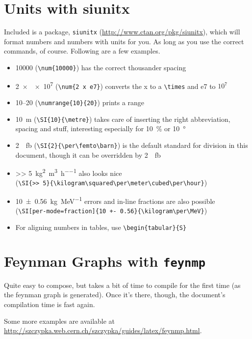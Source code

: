 \section{Units with siunitx} %
\label{sec:units_with_siunitx}
Included is a package, \texttt{siunitx} (\url{http://www.ctan.org/pkg/siunitx}), which will format numbers and numbers with units for you. As long as you use the correct commands, of course. Following are a few examples.
\begin{itemize}
	\item \num{10000} (\verb|\num{10000}|) has the correct thousander spacing
	\item \num{2 x e7} (\verb|\num{2 x e7}|) converts the x to a \verb|\times| and e7 to $10^7$
	\item \numrange{10}{20} (\verb|\numrange{10}{20}|) prints a range
	\item \SI{10}{\metre} (\verb|\SI{10}{\metre}|) takes care of inserting the right abbreviation, spacing and stuff, interesting especially for \SI{10}{\percent} or \SI{10}{\degree}
	\item \SI{2}{\per\femto\barn} (\verb|\SI{2}{\per\femto\barn}|) is the default standard for division in this document, though it can be overridden by \SI[per-mode=reciprocal]{2}{\per\femto\barn}
	\item \SI{>> 5}{\kilogram\squared\per\meter\cubed\per\hour} also looks nice \\
	(\verb|\SI{>> 5}{\kilogram\squared\per\meter\cubed\per\hour}|)
	\item \SI[per-mode=fraction]{10 +- 0.56}{\kilogram\per\MeV} errors and in-line fractions are also possible\\
	(\verb|\SI[per-mode=fraction]{10 +- 0.56}{\kilogram\per\MeV}|) 
	\item For aligning numbers in tables, use \verb|\begin{tabular}{S}|
\end{itemize}

\section{Feynman Graphs with \texttt{feynmp}} %
\label{sec:feynman_graphs_with_feynmp}
Quite easy to compose, but takes a bit of time to compile for the first time (as the feynman graph is generated). Once it's there, though, the document's compilation time is fast again.

Some more examples are available at\newline
\url{http://szczypka.web.cern.ch/szczypka/guides/latex/feynmp.html}.

